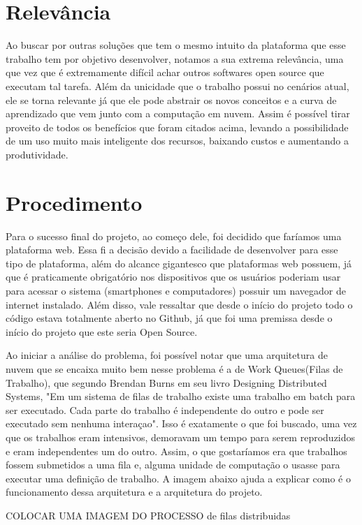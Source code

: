 \documentclass[11pt,twoside]{article}
\begin{document}
\section{Relevância}
Ao buscar por outras soluções que tem o mesmo intuito da plataforma que esse trabalho tem por objetivo desenvolver, notamos a sua extrema relevância, uma que vez que é extremamente difícil achar outros softwares
open source que executam tal tarefa.
Além da unicidade que o trabalho possui no cenários atual, ele se torna relevante já que ele pode abstrair os novos conceitos e a curva de aprendizado que vem junto com a computação em nuvem. Assim é possível
tirar proveito de todos os benefícios que foram citados acima, levando a possibilidade de um uso muito mais inteligente dos recursos, baixando custos e aumentando a produtividade.

\section{Procedimento}
Para o sucesso final do projeto, ao começo dele, foi decidido que faríamos uma plataforma web. Essa fi a decisão devido a facilidade de desenvolver para esse tipo de plataforma, além do alcance
gigantesco que plataformas web possuem, já que é praticamente obrigatório nos dispositivos que os usuários poderiam usar para acessar o sistema (smartphones e computadores) possuir um
navegador de internet instalado. Além disso, vale ressaltar que desde o início do projeto todo o código estava totalmente aberto no Github, já que foi uma premissa desde o início do projeto que este
seria Open Source.

Ao iniciar a análise do problema, foi possível notar que uma arquitetura de nuvem que se encaixa muito bem nesse problema é a de Work Queues(Filas de Trabalho), que segundo Brendan Burns em seu livro
Designing Distributed Systems, "Em um sistema de filas de trabalho existe uma trabalho em batch para ser executado. Cada parte do trabalho é independente do outro e pode ser executado sem nenhuma interaçao".
Isso é exatamente o que foi buscado, uma vez que os trabalhos eram intensivos, demoravam um tempo para serem reproduzidos e eram independentes um do outro. Assim, o que gostaríamos era que trabalhos fossem submetidos
a uma fila e, alguma unidade de computação o usasse para executar uma definição de trabalho. A imagem abaixo ajuda a explicar como é o funcionamento dessa arquitetura e a arquitetura do projeto.

COLOCAR UMA IMAGEM DO PROCESSO de filas distribuidas
\end{document}
